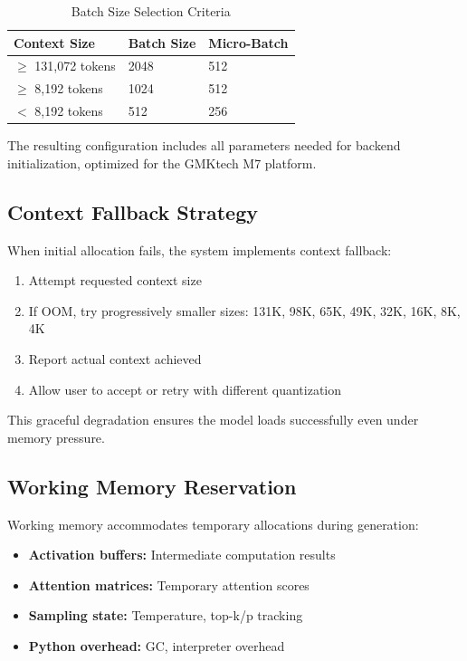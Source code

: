 \begin{table}[h]
\centering
\caption{Batch Size Selection Criteria}
\label{tab:batch_sizing}
\begin{tabular}{lll}
\toprule
\textbf{Context Size} & \textbf{Batch Size} & \textbf{Micro-Batch} \\
\midrule
$\geq$ 131,072 tokens & 2048 & 512 \\
$\geq$ 8,192 tokens & 1024 & 512 \\
$<$ 8,192 tokens & 512 & 256 \\
\bottomrule
\end{tabular}
\end{table}

The resulting configuration includes all parameters needed for backend initialization, optimized for the GMKtech M7 platform.

\subsection{Context Fallback Strategy}

When initial allocation fails, the system implements context fallback:

\begin{enumerate}
    \item Attempt requested context size
    \item If OOM, try progressively smaller sizes: 131K, 98K, 65K, 49K, 32K, 16K, 8K, 4K
    \item Report actual context achieved
    \item Allow user to accept or retry with different quantization
\end{enumerate}

This graceful degradation ensures the model loads successfully even under memory pressure.

\subsection{Working Memory Reservation}

Working memory accommodates temporary allocations during generation:

\begin{itemize}
    \item \textbf{Activation buffers:} Intermediate computation results
    \item \textbf{Attention matrices:} Temporary attention scores
    \item \textbf{Sampling state:} Temperature, top-k/p tracking
    \item \textbf{Python overhead:} GC, interpreter overhead
\end{itemize}

